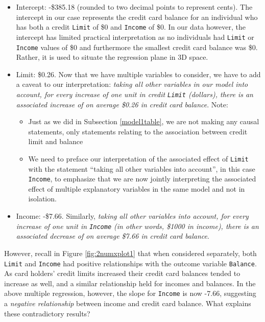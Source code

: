 \documentclass[12pt, krantz2,]{krantz}
\providecommand{\tightlist}{%
  \setlength{\itemsep}{0pt}\setlength{\parskip}{0pt}}
\begin{document}
\begin{itemize}
\tightlist
\item
  Intercept: -\$385.18 (rounded to two decimal points to represent cents). The intercept in our case represents the credit card balance for an individual who has both a credit \texttt{Limit} of \$0 and \texttt{Income} of \$0. In our data however, the intercept has limited practical interpretation as no individuals had \texttt{Limit} or \texttt{Income} values of \$0 and furthermore the smallest credit card balance was \$0. Rather, it is used to situate the regression plane in 3D space.
\item
  Limit: \$0.26. Now that we have multiple variables to consider, we have to add
  a caveat to our interpretation: \emph{taking all other variables in our model into account, for every increase of one unit in credit \texttt{Limit} (dollars), there is an associated increase of on average \$0.26 in credit card balance}. Note:

  \begin{itemize}
  \tightlist
  \item
    Just as we did in Subsection \ref{model1table}, we are not making any causal statements, only statements relating to the association between credit limit and balance
  \item
    We need to preface our interpretation of the associated effect of \texttt{Limit} with the statement ``taking all other variables into account'', in this case \texttt{Income}, to emphasize that we are now jointly interpreting the associated effect of multiple explanatory variables in the same model and not in isolation.
  \end{itemize}
\item
  Income: -\$7.66. Similarly, \emph{taking all other variables into account, for every increase of one unit in \texttt{Income} (in other words, \$1000 in income), there is an associated decrease of on average \$7.66 in credit card balance}.
\end{itemize}

However, recall in Figure \ref{fig:2numxplot1} that when considered separately, both \texttt{Limit} and \texttt{Income} had positive relationships with the outcome variable \texttt{Balance}. As card holders' credit limits increased their credit card balances tended to increase as well, and a similar relationship held for incomes and balances. In the above multiple regression, however, the slope for \texttt{Income} is now -7.66, suggesting a \emph{negative relationship} between income and credit card balance. What explains these contradictory results?
\end{document}
